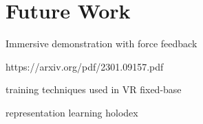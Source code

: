 \chapter{Future Work}

Immersive demonstration with force feedback 

https://arxiv.org/pdf/2301.09157.pdf

training techniques used in VR fixed-base

representation learning holodex

